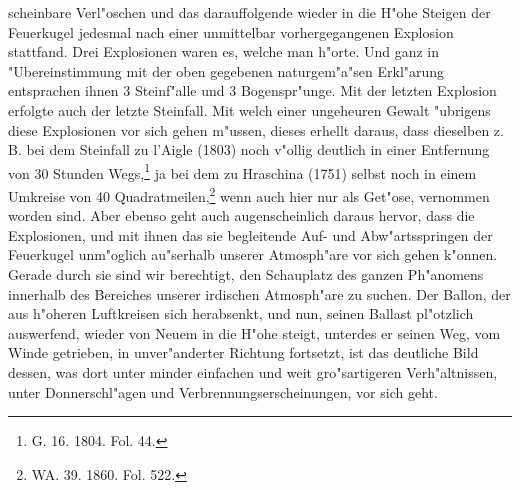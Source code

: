\documentclass[a4paper, 8pt, oneside, polutonikogreek, german]{article}
\begin{document}
scheinbare Verl"oschen und das darauffolgende wieder in die H"ohe Steigen der Feuerkugel jedesmal nach einer unmittelbar vorhergegangenen Explosion stattfand. Drei Explosionen waren es, welche man h"orte. Und ganz in "Ubereinstimmung mit der oben gegebenen naturgem"a"sen Erkl"arung entsprachen ihnen 3 Steinf"alle und 3 Bogenspr"unge. Mit der letzten Explosion erfolgte auch der letzte Steinfall. Mit welch einer ungeheuren Gewalt "ubrigens diese Explosionen vor sich gehen m"ussen, dieses erhellt daraus, dass dieselben z. B. bei dem Steinfall zu l'Aigle (1803) noch v"ollig deutlich in einer Entfernung von 30 Stunden Wegs,\footnote{G. 16. 1804. Fol. 44.} ja bei dem zu Hraschina (1751) selbst noch in einem Umkreise von 40 Quadratmeilen,\footnote{WA. 39. 1860. Fol. 522.} wenn auch hier nur als Get"ose, vernommen worden sind. Aber ebenso geht auch augenscheinlich daraus hervor, dass die Explosionen, und mit ihnen das sie begleitende Auf- und Abw"artsspringen der Feuerkugel unm"oglich au"serhalb unserer Atmosph"are vor sich gehen k"onnen. Gerade durch sie sind wir berechtigt, den Schauplatz des ganzen Ph"anomens innerhalb des Bereiches unserer irdischen Atmosph"are zu suchen. Der Ballon, der aus h"oheren Luftkreisen sich herabsenkt, und nun, seinen Ballast pl"otzlich auswerfend, wieder von Neuem in die H"ohe steigt, unterdes er seinen Weg, vom Winde getrieben, in unver"anderter Richtung fortsetzt, ist das deutliche Bild dessen, was dort unter minder einfachen und weit gro"sartigeren Verh"altnissen, unter Donnerschl"agen und Verbrennungserscheinungen, vor sich geht.
\end{document}
